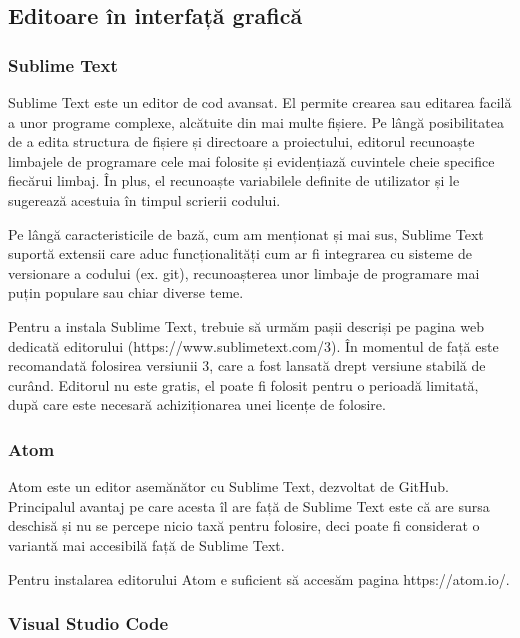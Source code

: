 \subsection{Editoare în interfață grafică}
\label{sec:appdev-graphicedit}

\subsubsection{Sublime Text}
\label{sec:appdev-graphicedit-sublime}

Sublime Text este un editor de cod avansat. El permite crearea sau editarea
facilă a unor programe complexe, alcătuite din mai multe fișiere. Pe lângă
posibilitatea de a edita structura de fișiere și directoare a proiectului,
editorul recunoaște limbajele de programare cele mai folosite și evidențiază
cuvintele cheie specifice fiecărui limbaj. În plus, el recunoaște variabilele
definite de utilizator și le sugerează acestuia în timpul scrierii codului.

Pe lângă caracteristicile de bază, cum am menționat și mai sus, Sublime Text
suportă extensii care aduc funcționalități cum ar fi integrarea cu sisteme de
versionare a codului (ex. git), recunoașterea unor limbaje de programare mai
puțin populare sau chiar diverse teme.

Pentru a instala Sublime Text, trebuie să urmăm pașii descriși pe pagina web
dedicată editorului (https://www.sublimetext.com/3). În momentul de față este
recomandată folosirea versiunii 3, care a fost lansată drept versiune stabilă de
curând. Editorul nu este gratis, el poate fi folosit pentru o perioadă limitată,
după care este necesară achiziționarea unei licențe de folosire.

\subsubsection{Atom}
\label{sec:appdev-graphicedit-atom}

Atom este un editor asemănător cu Sublime Text, dezvoltat de GitHub. Principalul
avantaj pe care acesta îl are față de Sublime Text este că are sursa deschisă și
nu se percepe nicio taxă pentru folosire, deci poate fi considerat o variantă
mai accesibilă față de Sublime Text.

Pentru instalarea editorului Atom e suficient să accesăm pagina
https://atom.io/.

\subsubsection{Visual Studio Code}
\label{sec:appdev-graphicedit-vsc}


